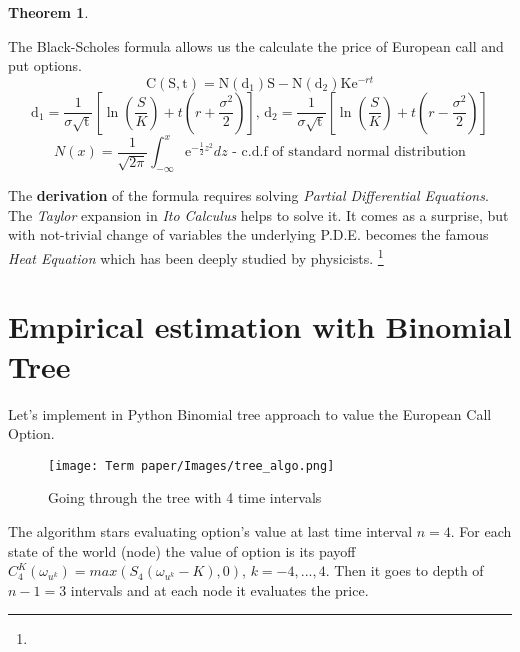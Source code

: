 \documentclass[11pt]{article}
\newtheorem{theorem}{Theorem}
\begin{document}
\begin{theorem}

\end{theorem}

The Black-Scholes formula allows us the calculate the price of European call and put options.
\begin{equation}
	\mathrm C(\mathrm S,\mathrm t)= \mathrm N(\mathrm d_1)\mathrm S - \mathrm N(\mathrm d_2) \mathrm K \mathrm e^{-rt}
	\label{eq:2}
\end{equation}
\[
	\mathrm d_1= \frac{1}{\sigma \sqrt{\mathrm t}} \left[\ln{\left(\frac{S}{K}\right)} + t\left(r + \frac{\sigma^2}{2} \right) \right] \text{, }
	\mathrm d_2= \frac{1}{\sigma \sqrt{\mathrm t}} \left[\ln{\left(\frac{S}{K}\right)} + t\left(r - \frac{\sigma^2}{2} \right) \right]
\]
\[
	N(x)=\frac{1}{\sqrt{2\pi}} \int_{-\infty}^{x} \mathrm e^{-\frac{1}{2}z^2} dz \text{  - c.d.f of standard normal distribution}
\]

The \textbf{derivation} of the formula requires solving \textit{Partial Differential Equations}. The \textit{Taylor} expansion in \textit{Ito Calculus} helps to solve it.\cite{ICEF_A} It comes as a surprise, but with not-trivial change of variables the underlying P.D.E. becomes the famous \textit{Heat Equation} which has been deeply studied by physicists. \footnote{}


\newpage
\section{Empirical estimation with Binomial Tree}
Let's implement in Python Binomial tree approach to value the European Call Option.

\begin{figure}[H]
  \centering
  \texttt{[image: Term paper/Images/tree\_algo.png]}
  \caption{Going through the tree with 4 time intervals}
  \label{fig:algtree}
\end{figure}
The algorithm stars evaluating option's value at last time interval $n=4$. For each state of the world (node) the value of option is its payoff $C_4^K(\omega_{u^k}) = max{(S_4(\omega_{u^k}-K), 0)}$, $k = -4,...,4$. Then it goes to depth of $n - 1 = 3$ intervals and at each node it evaluates the price. 
\end{document}
